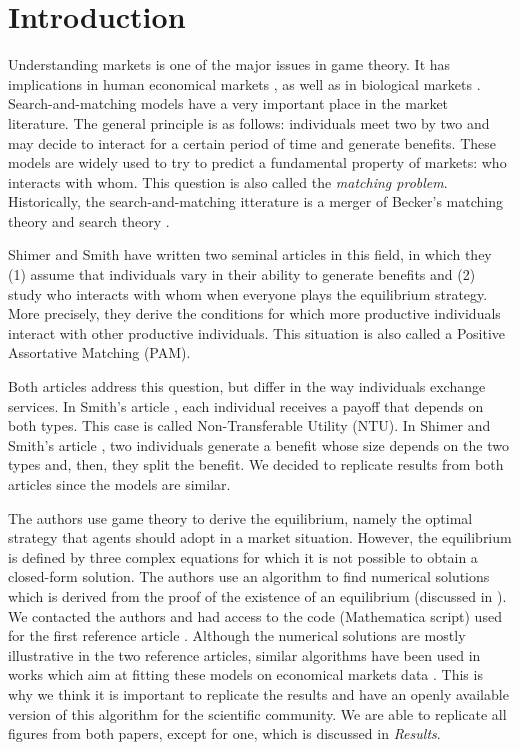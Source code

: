 \section*{Introduction}

Understanding markets is one of the major issues in game theory. It has implications in human economical markets \citep{osborne_bargaining_1990,chade_sorting_2017}, as well as in biological markets \citep{noe_biological_1995,hammerstein_biological_2016,fruteau_supply_2009,baumard_mutualistic_2013}. Search-and-matching models have a very important place in the market literature. The general principle is as follows: individuals meet two by two and may decide to interact for a certain period of time and generate benefits. These models are widely used to try to predict a fundamental property of markets: who interacts with whom. This question is also called the \textit{matching problem}. Historically, the search-and-matching itterature is a merger of Becker's matching theory \citep{becker_theory_1973} and search theory \citep{stigler_economics_1961,rogerson_search-theoretic_2005}.

Shimer and Smith have written two seminal articles \citep{shimer_assortative_2000,smith_marriage_2006} in this field, in which they (1) assume that individuals vary in their ability to generate benefits and (2) study who interacts with whom when everyone plays the equilibrium strategy. More precisely, they derive the conditions for which more productive individuals interact with other productive individuals. This situation is also called a Positive Assortative Matching (PAM).

Both articles address this question, but differ in the way individuals exchange services. In Smith's article \citep{smith_marriage_2006}, each individual receives a payoff that depends on both types. This case is called Non-Transferable Utility (NTU). In Shimer and Smith's article \citep{shimer_assortative_2000}, two individuals generate a benefit whose size depends on the two types and, then, they split the benefit. We decided to replicate results from both articles since the models are similar.

The authors use game theory to derive the equilibrium, namely the optimal strategy that agents should adopt in a market situation. However, the equilibrium is defined by three complex equations for which it is not possible to obtain a closed-form solution. The authors use an algorithm to find numerical solutions which is derived from the proof of the existence of an equilibrium (discussed in \citep{smith_frictional_2011}). We contacted the authors and had access to the code (Mathematica script) used for the first reference article \citep{shimer_assortative_2000}. Although the numerical solutions are mostly illustrative in the two reference articles, similar algorithms have been used in works which aim at fitting these models on economical markets data \citep{hagedorn_identifying_2017,lise_matching_2016}. This is why we think it is important to replicate the results and have an openly available version of this algorithm for the scientific community. We are able to replicate all figures from both papers, except for one, which is discussed in \textit{Results}.




